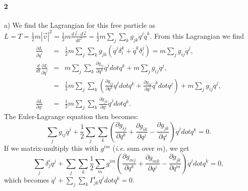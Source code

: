 \documentclass[letterpaper,11pt]{article}
\begin{document}
\paragraph*{2}

a) We find the Lagrangian for this free particle as $L = T = \frac{1}{2} m |\vec{v}|^2 = \frac{1}{2} m \frac{d\vec{s} \cdot d\vec{s}}{dt^2} = \frac{1}{2} m \sum_j \sum_k g_{jk} \dot{q}^j \dot{q}^k$.  From this Lagrangian we find
\begin{eqnarray*}
\frac{\partial L}{\partial \dot{q}^i} & = & \frac{1}{2} m \sum_j \sum_k g_{jk} (\dot{q}^j \delta_i^k + \dot{q}^k \delta_i^j) = m \sum_j g_{ij} \dot{q}^j, \\
\frac{d}{dt} \frac{\partial L}{\partial \dot{q}^i} & = & m \sum_j \sum_k \frac{\partial g_{ij}}{\partial q^k} \dot{q}^j dot{q}^k + m \sum_j g_{ij} \ddot{q}^j, \\
 & = & \frac{1}{2} m \sum_j \sum_k \left( \frac{\partial g_{ij}}{\partial q^k} \dot{q}^j dot{q}^k + \frac{\partial g_{ik}}{\partial q^j} \dot{q}^k dot{q}^j \right) + m \sum_j g_{ij} \ddot{q}^j, \\
\frac{\partial L}{\partial q^i} & = & \frac{1}{2} m \sum_j \sum_k \frac{\partial g_{jk}}{\partial q^i} \dot{q}^j dot{q}^k.
\end{eqnarray*}
The Euler-Lagrange equation then becomes:
\begin{equation*}
 \sum_j g_{ij} \ddot{q}^j + \frac{1}{2} \sum_j \sum_k \left( \frac{\partial g_{ij}}{\partial q^k} + \frac{\partial g_{ik}}{\partial q^j} - \frac{\partial g_{jk}}{\partial q^i} \right) \dot{q}^j dot{q}^k = 0.
\end{equation*}
If we matrix-multiply this with $g^{im}$ (\textit{i.e.} sum over $m$), we get
\begin{equation*}
 \sum_j \delta^i_j \ddot{q}^j + \sum_j \sum_k \frac{1}{2} \sum_m g^{im} \left( \frac{\partial g_{mj}}{\partial q^k} + \frac{\partial g_{mk}}{\partial q^j} - \frac{\partial g_{jk}}{\partial q^m} \right) \dot{q}^j dot{q}^k = 0,
\end{equation*}
which becomes $\ddot{q}^i + \sum_j \sum_k \Gamma^i_{jk} \dot{q}^j dot{q}^k = 0$.
\end{document}
